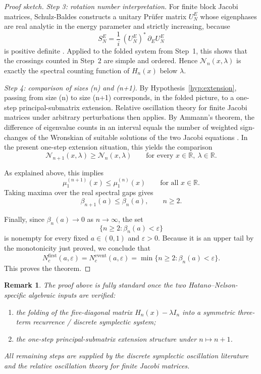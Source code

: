 \documentclass[11pt]{article}
\numberwithin{equation}{section}
\newtheorem{remark}{Remark}
\begin{document}
\begin{proof}[Proof sketch]
\medskip
\noindent
\textit{Step 3: rotation number interpretation.}
For finite block Jacobi matrices, Schulz-Baldes constructs a unitary Prüfer matrix
\(U_N^E\) whose eigenphases are real analytic in the energy parameter and strictly increasing,
because
\[
S_N^E=\frac{1}{i}\,(U_N^E)^*\,\partial_E U_N^E
\]
is positive definite \cite{SchulzBaldes2007}. Applied to the folded system from Step~1, this
shows that the crossings counted in Step~2 are simple and ordered. Hence \(\mathcal N_n(x,\lambda)\)
is exactly the spectral counting function of \(H_n(x)\) below \(\lambda\).

\medskip
\noindent
\textit{Step 4: comparison of sizes (n) and (n+1).}
By Hypothesis~\ref{hyp:extension}, passing from size (n) to size (n+1) corresponds, in the
folded picture, to a one-step principal-submatrix extension. Relative oscillation theory for finite
Jacobi matrices under arbitrary perturbations then applies. By Ammann's theorem, the difference
of eigenvalue counts in an interval equals the number of weighted sign-changes of the Wronskian
of suitable solutions of the two Jacobi equations \cite{Ammann2014}. In the present one-step
extension situation, this yields the comparison
\[
\mathcal N_{n+1}(x,\lambda)\ge \mathcal N_n(x,\lambda)
\qquad\text{for every }x\in\mathbb R,\ \lambda\in\mathbb R.
\]

As explained above, this implies
\[
\mu_1^{(n+1)}(x)\le \mu_1^{(n)}(x)
\qquad\text{for all }x\in\mathbb R.
\]
Taking maxima over the real spectral gaps gives
\[
\beta_{n+1}(a)\le \beta_n(a),
\qquad n\ge2.
\]

Finally, since \(\beta_n(a)\to0\) as \(n\to\infty\), the set
\[
\{n\ge2:\beta_n(a)<\varepsilon\}
\]
is nonempty for every fixed \(a\in(0,1)\) and \(\varepsilon>0\). Because it is an upper tail by
the monotonicity just proved, we conclude that
\[
N_c^{\mathrm{first}}(a,\varepsilon)
=
N_c^{\mathrm{event}}(a,\varepsilon)
=
\min\{n\ge2:\beta_n(a)<\varepsilon\}.
\]
This proves the theorem.
\end{proof}

\begin{remark}
The proof above is fully standard once the two Hatano--Nelson-specific algebraic inputs are
verified:

\begin{enumerate}
\item the folding of the five-diagonal matrix \(H_n(x)-\lambda I_n\) into a symmetric three-term
recurrence / discrete symplectic system;
\item the one-step principal-submatrix extension structure under \(n\mapsto n+1\).
\end{enumerate}

All remaining steps are supplied by the discrete symplectic oscillation literature and the relative
oscillation theory for finite Jacobi matrices.
\end{remark}
\end{document}
